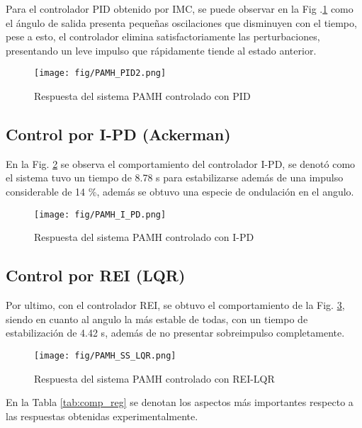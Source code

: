 \documentclass[conference,onecolumn,12pt]{IEEEtran}
\numberwithin{equation}{subsection}
\begin{document}
Para el controlador PID obtenido por IMC, se puede observar en la Fig .\ref{fig:pamhsys_pid} como el ángulo de salida presenta pequeñas oscilaciones que disminuyen con el tiempo, pese a esto, el controlador elimina satisfactoriamente las perturbaciones, presentando un leve impulso que rápidamente tiende al estado anterior.

\begin{figure}[htbp]
    \centering
    \texttt{[image: fig/PAMH\_PID2.png]}
    \caption{Respuesta del sistema PAMH controlado con PID}
    \label{fig:pamhsys_pid}
\end{figure}

\subsection{Control por I-PD (Ackerman)}

En la Fig. \ref{fig:pamhsys_ipd} se observa el comportamiento del controlador I-PD, se denotó como el sistema tuvo un tiempo de 8.78 s para estabilizarse además de una impulso considerable de 14 \%, además se obtuvo una especie de ondulación en el angulo.

\begin{figure}[htbp]
    \centering
    \texttt{[image: fig/PAMH\_I\_PD.png]}
    \caption{Respuesta del sistema PAMH controlado con I-PD}
    \label{fig:pamhsys_ipd}
\end{figure}

\subsection{Control por REI (LQR)}

Por ultimo, con el controlador REI, se obtuvo el comportamiento de la Fig. \ref{fig:pamhsys_ss_lqr}, siendo en cuanto al angulo la más estable de todas, con un tiempo de estabilización de 4.42 s, además de no presentar sobreimpulso completamente.

\begin{figure}[htbp]
    \centering
    \texttt{[image: fig/PAMH\_SS\_LQR.png]}
    \caption{Respuesta del sistema PAMH controlado con REI-LQR}
    \label{fig:pamhsys_ss_lqr}
\end{figure}

En la Tabla \ref{tab:comp_reg} se denotan los aspectos más importantes respecto a las respuestas obtenidas experimentalmente.
\end{document}

